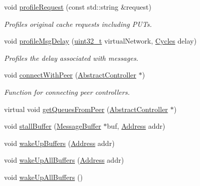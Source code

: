 \begin{DoxyCompactItemize}
\item 
void \hyperlink{classAbstractController_a8bb6029436f36f339582bda79270fa10}{profileRequest} (const std::string \&request)
\begin{DoxyCompactList}\small\item\em Profiles original cache requests including PUTs. \item\end{DoxyCompactList}\item 
void \hyperlink{classAbstractController_a6bc3835966ece2b6fb72a056f447a68e}{profileMsgDelay} (\hyperlink{Type_8hh_a435d1572bf3f880d55459d9805097f62}{uint32\_\-t} virtualNetwork, \hyperlink{classCycles}{Cycles} delay)
\begin{DoxyCompactList}\small\item\em Profiles the delay associated with messages. \item\end{DoxyCompactList}\item 
void \hyperlink{classAbstractController_a8d382287e22ac84bc108ad9ea6621603}{connectWithPeer} (\hyperlink{classAbstractController}{AbstractController} $\ast$)
\begin{DoxyCompactList}\small\item\em Function for connecting peer controllers. \item\end{DoxyCompactList}\item 
virtual void \hyperlink{classAbstractController_a9a66179697aa43bfa97cee9cf8dbad19}{getQueuesFromPeer} (\hyperlink{classAbstractController}{AbstractController} $\ast$)
\item 
void \hyperlink{classAbstractController_a4f512122c5d5042bb9da1a0d1fb4c920}{stallBuffer} (\hyperlink{classMessageBuffer}{MessageBuffer} $\ast$buf, \hyperlink{classAddress}{Address} addr)
\item 
void \hyperlink{classAbstractController_aa205de64042612c18d6104532fc72024}{wakeUpBuffers} (\hyperlink{classAddress}{Address} addr)
\item 
void \hyperlink{classAbstractController_ac01a761bbe6f761c62b6f5ff72ab1c3f}{wakeUpAllBuffers} (\hyperlink{classAddress}{Address} addr)
\item 
void \hyperlink{classAbstractController_aa595bebc4acf9a8dfec0b5a99f0b86e2}{wakeUpAllBuffers} ()
\end{DoxyCompactItemize}
